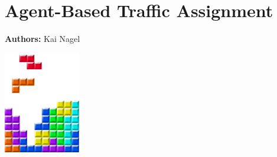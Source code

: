 \chapter{Agent-Based Traffic Assignment }
\label{ch:abta}

\hfill \textbf{Authors:} Kai Nagel

\begin{center} \includegraphics[width=0.25\textwidth, angle=0]{figures/MATSimBook.png} \end{center}


